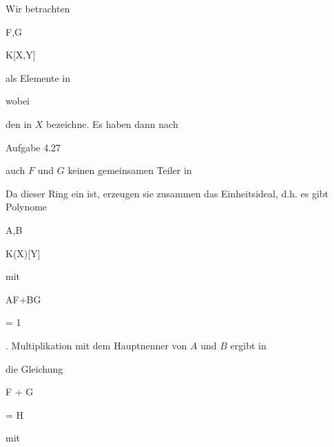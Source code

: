 {


Wir betrachten


\mavergleichskette


{\vergleichskette


{ F,G
}


{ \in }{ K[X,Y]
}


{  }{
}


{    }{
}


{   }{
}


}
{}{}{}
als Elemente in


 wobei


 den
in $X$ bezeichne. Es haben dann nach

Aufgabe 4.27

auch $F$ und $G$ keinen gemeinsamen Teiler in


 Da dieser Ring ein
ist, erzeugen sie zusammen das Einheitsideal, d.h. es gibt Polynome


\mavergleichskette


{\vergleichskette


{ A,B
}


{ \in }{ K(X)[Y]
}


{  }{
}


{    }{
}


{   }{
}


}
{}{}{}
mit


\mavergleichskette


{\vergleichskette


{ AF+BG
}


{ = }{ 1
}


{  }{
}


{    }{
}


{   }{
}


}
{}{}{.}
Multiplikation mit dem Hauptnenner von $A$ und $B$ ergibt in


 die Gleichung


\mavergleichskette


{\vergleichskette


{  F + G
}


{ = }{ H
}


{  }{
}


{    }{
}


{   }{
}


}
{}{}{}
mit


\mavergleichskette


}
